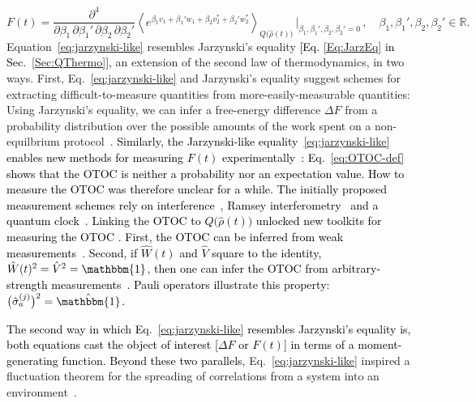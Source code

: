 \documentclass[%
 reprint,
superscriptaddress,
nofootinbib,
bibnotes,
 amsmath,amssymb,
 aps,
]{revtex4-1}
\theoremstyle{plain}
\newcommand{\Dave}[1]{\textcolor{black}{#1} }
\newcommand{\nicole}[1]{\textcolor{black}{#1} }
\newcommand{\LParen}{ \bm{(} }
\newcommand{\RParen}{ \bm{)} }
\begin{document}
\begin{equation}\label{eq:jarzynski-like}
	F(t) 
    = \frac{\partial^4}{\partial \beta_1 \, \partial \beta_1'\, \partial \beta_2 \, \partial \beta_2'} 
    \left\langle 
    e^{\beta_1 v_1  + \beta_1' w_1 + \beta_2 v_2^* +\beta_2'  w_2^*} 
    \right\rangle_{Q \LParen  \hat{\rho}(t)  \RParen} \, 
    \Big\vert_{\beta_1, \beta_1', \beta_2,\beta_2' = 0} \, , \quad \beta_1,\beta_1', \beta_2,\beta_2' \in \mathbb{R}.
\end{equation}
Equation~\eqref{eq:jarzynski-like} resembles Jarzynski's equality \Dave{[Eq. \eqref{Eq:JarzEq} in Sec.~\ref{Sec:QThermo}],} an extension of the second law of thermodynamics, in two ways. 
First, Eq.~\eqref{eq:jarzynski-like} and Jarzynski's equality suggest schemes for extracting difficult-to-measure quantities from more-easily-measurable quantities: Using Jarzynski's equality, we can infer a free-energy difference $\Delta F$ from a probability distribution over the possible amounts of the work spent on a non-equilbrium protocol~\cite{Jarzynski_equilibrium_1997, Talkner_fluctuation_2007}.
\nicole{Similarly, the Jarzynski-like equality~\eqref{eq:jarzynski-like} enables new methods for measuring $F(t)$ experimentally~\cite{NYH_jarzynski_2017}:
Eq.~\eqref{eq:OTOC-def} shows that the OTOC is neither a probability nor an expectation value.  
How to measure the  OTOC was therefore unclear for a while.
The initially proposed measurement schemes rely on 
interference~\cite{Swingle_Measuring_2016}, Ramsey interferometry~\cite{Yao_Interferometric_2016} and a quantum clock~\cite{Zhu_Measurement_2016}. Linking the OTOC to 
$Q  \LParen  \hat{\rho}(t)  \RParen$ 
unlocked new toolkits for measuring the OTOC
\cite{NYH_jarzynski_2017, NYH_quasiprobability_2018}.
First, the OTOC can be inferred from weak measurements~\cite{NYH_jarzynski_2017,NYH_quasiprobability_2018}.
Second, if $\hat{W}(t)$ and $\hat{V}$ square to the identity, $\hat{W}(t)^2 = \hat{V}^2 = \mathbbm{1}$, then one can infer the OTOC from arbitrary-strength measurements~\cite{Dressel_strengthening_2018, Mohseninia_optimizing_2019}.
Pauli operators illustrate this property: $\big( \hat{\sigma}_a^{(j)} \big)^2 = \hat{\mathbbm{1}}$.}

\Dave{The second way in which Eq.~\eqref{eq:jarzynski-like} resembles Jarzynski's equality is, both equations cast the object of interest [$\Delta F$ or $F(t)$] in terms of a moment-generating function.}
\nicole{Beyond these two parallels, }
Eq.~\eqref{eq:jarzynski-like} inspired a fluctuation theorem for the spreading of correlations from a system into an environment~\cite{Zhang_Quasiprobability_2022}.
\end{document}
